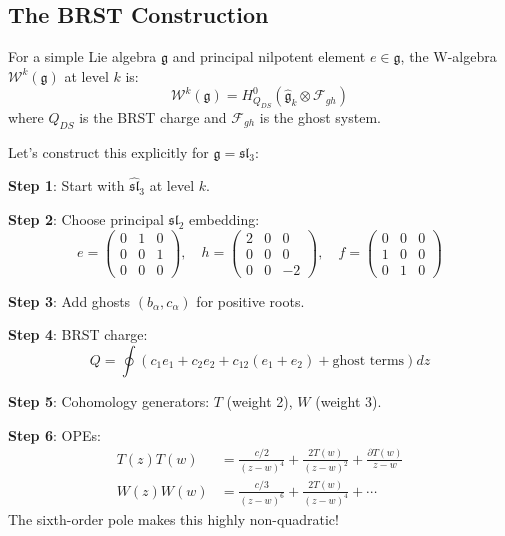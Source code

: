 \subsection{The BRST Construction}

\begin{definition}
For a simple Lie algebra $\mathfrak{g}$ and principal nilpotent element $e \in \mathfrak{g}$, the W-algebra $\mathcal{W}^k(\mathfrak{g})$ at level $k$ is:
\[
\mathcal{W}^k(\mathfrak{g}) = H^0_{Q_{DS}}(\hat{\mathfrak{g}}_k \otimes \mathcal{F}_{gh})
\]
where $Q_{DS}$ is the BRST charge and $\mathcal{F}_{gh}$ is the ghost system.
\end{definition}

Let's construct this explicitly for $\mathfrak{g} = \mathfrak{sl}_3$:

\begin{example}
\textbf{Step 1}: Start with $\hat{\mathfrak{sl}}_3$ at level $k$.

\textbf{Step 2}: Choose principal $\mathfrak{sl}_2$ embedding:
\[
e = \begin{pmatrix} 0 & 1 & 0 \\ 0 & 0 & 1 \\ 0 & 0 & 0 \end{pmatrix}, \quad
h = \begin{pmatrix} 2 & 0 & 0 \\ 0 & 0 & 0 \\ 0 & 0 & -2 \end{pmatrix}, \quad
f = \begin{pmatrix} 0 & 0 & 0 \\ 1 & 0 & 0 \\ 0 & 1 & 0 \end{pmatrix}
\]

\textbf{Step 3}: Add ghosts $(b_\alpha, c_\alpha)$ for positive roots.

\textbf{Step 4}: BRST charge:
\[
Q = \oint \left( c_1 e_1 + c_2 e_2 + c_{12}(e_1 + e_2) + \text{ghost terms} \right) dz
\]

\textbf{Step 5}: Cohomology generators: $T$ (weight 2), $W$ (weight 3).

\textbf{Step 6}: OPEs:
\begin{align}
T(z)T(w) &= \frac{c/2}{(z-w)^4} + \frac{2T(w)}{(z-w)^2} + \frac{\partial T(w)}{z-w} \\
W(z)W(w) &= \frac{c/3}{(z-w)^6} + \frac{2T(w)}{(z-w)^4} + \cdots
\end{align}
The sixth-order pole makes this highly non-quadratic!
\end{example}


